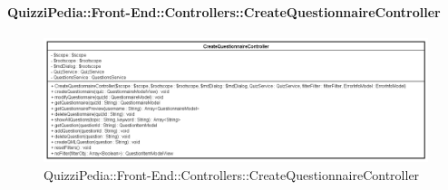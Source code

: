 \paragraph[QuizziPedia::Front-End::Controllers\\::CreateQuestionnaireController]{QuizziPedia::Front-End::Controllers::CreateQuestionnaireController}
\begin{figure} [ht]
	\centering
	\includegraphics[scale=0.4]{UML/Classi/Front-End/QuizziPedia_Front-end_Controller_CreateQuestionnaireController.png}
	\caption{QuizziPedia::Front-End::Controllers::CreateQuestionnaireController}
\end{figure} \FloatBarrier
